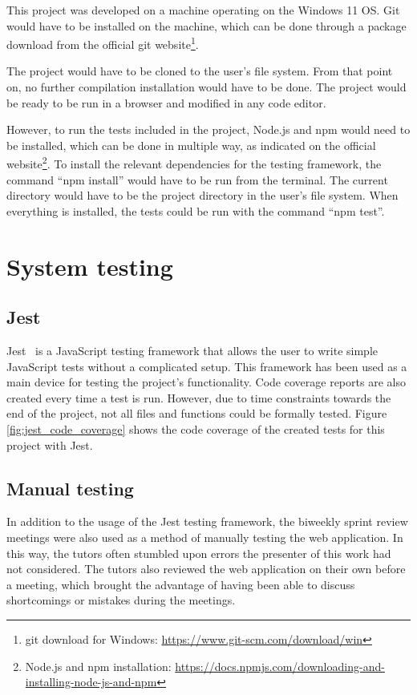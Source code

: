 This project was developed on a machine operating on the Windows 11 OS. Git would have to be installed on the machine, which can be done through a package download from the official git website\footnote{git download for Windows: \url{https://www.git-scm.com/download/win}}.

The project would have to be cloned to the user's file system. From that point on, no further compilation installation would have to be done. The project would be ready to be run in a browser and modified in any code editor.

However, to run the tests included in the project, Node.js and npm would need to be installed, which can be done in multiple way, as indicated on the official website\footnote{Node.js and npm installation: \url{https://docs.npmjs.com/downloading-and-installing-node-js-and-npm}}. To install the relevant dependencies for the testing framework, the command ``npm install'' would have to be run from the terminal. The current directory would have to be the project directory in the user's file system. When everything is installed, the tests could be run with the command ``npm test''.

\section{System testing}
\subsection{Jest}
Jest~\cite{jest} is a JavaScript testing framework that allows the user to write simple JavaScript tests without a complicated setup. This framework has been used as a main device for testing the project's functionality. Code coverage reports are also created every time a test is run. However, due to time constraints towards the end of the project, not all files and functions could be formally tested. Figure \ref{fig:jest_code_coverage} shows the code coverage of the created tests for this project with Jest.

\subsection{Manual testing}
In addition to the usage of the Jest testing framework, the biweekly sprint review meetings were also used as a method of manually testing the web application. In this way, the tutors often stumbled upon errors the presenter of this work had not considered. The tutors also reviewed the web application on their own before a meeting, which brought the advantage of having been able to discuss shortcomings or mistakes during the meetings.

